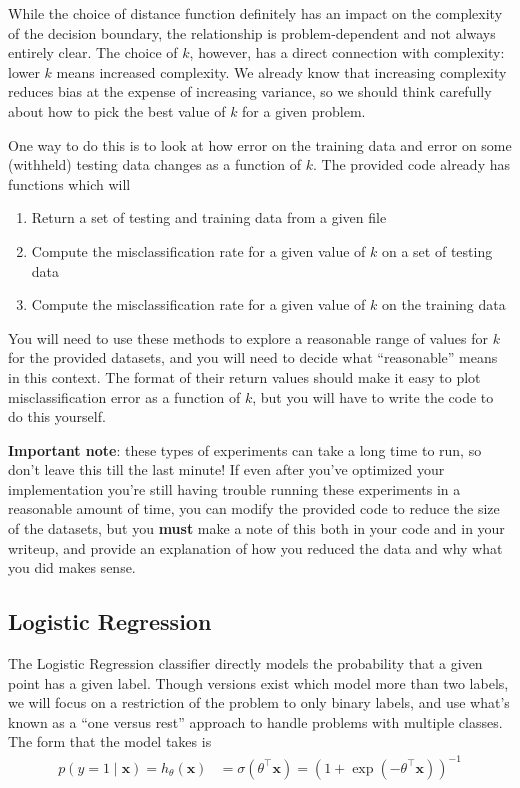 \documentclass{article}
\begin{document}
While the choice of distance function definitely has an impact on the complexity of the decision boundary, the relationship is problem-dependent and not always entirely clear. The choice of \(k\), however, has a direct connection with complexity: lower \(k\) means increased complexity. We already know that increasing complexity reduces bias at the expense of increasing variance, so we should think carefully about how to pick the best value of \(k\) for a given problem.

One way to do this is to look at how error on the training data and error on some (withheld) testing data changes as a function of \(k\). The provided code already has functions which will
\begin{enumerate}
	\item Return a set of testing and training data from a given file
	\item Compute the misclassification rate for a given value of \(k\) on a set of testing data
	\item Compute the misclassification rate for a given value of \(k\) on the training data
\end{enumerate}

You will need to use these methods to explore a reasonable range of values for \(k\) for the provided datasets, and you will need to decide what ``reasonable'' means in this context. The format of their return values should make it easy to plot misclassification error as a function of \(k\), but you will have to write the code to do this yourself.

\textbf{Important note}: these types of experiments can take a long time to run, so don't leave this till the last minute! If even after you've optimized your implementation you're still having trouble running these experiments in a reasonable amount of time, you can modify the provided code to reduce the size of the datasets, but you \textbf{must} make a note of this both in your code and in your writeup, and provide an explanation of how you reduced the data and why what you did makes sense.

\subsection*{Logistic Regression}

The Logistic Regression classifier directly models the probability that a given point has a given label. Though versions exist which model more than two labels, we will focus on a restriction of the problem to only binary labels, and use what's known as a ``one versus rest'' approach to handle problems with multiple classes. The form that the model takes is
\begin{align}
	p(y=1\mid\mathbf{x}) = h_\theta(\mathbf{x}) &= \sigma(\theta^\top\mathbf{x}) = \left( 1+\exp(-\theta^\top\mathbf{x}) \right)^{-1}
\end{align}
\end{document}
